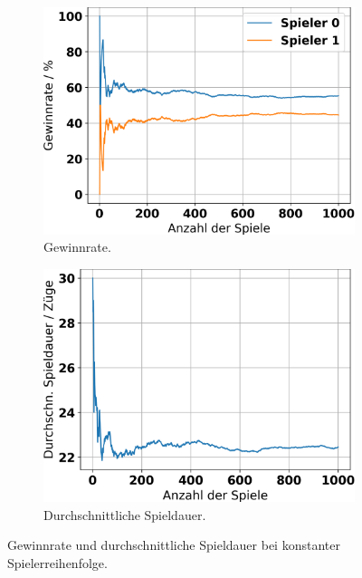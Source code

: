 \begin{figure}[ht!]%
	\begin{subfigure}[b]{0.48\textwidth}
		\includegraphics[width=\textwidth]{Bilder/random_vs_random_constant_player_order_graph_win_rates.png}
		\caption{Gewinnrate.}
		\label{fig:f1}
	\end{subfigure}
	\hfill
	\begin{subfigure}[b]{0.48\textwidth}
		\includegraphics[width=\textwidth]{Bilder/random_vs_random_constant_player_order_graph_game_length.png}
		\caption{Durchschnittliche Spieldauer.}
		\label{fig:f2}
	\end{subfigure}
	\caption{Gewinnrate und durchschnittliche Spieldauer bei konstanter Spielerreihenfolge.}
\end{figure}

